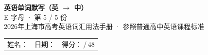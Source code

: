 \documentclass[10pt,a4paper]{article}
\begin{document}
\pagestyle{plain}

\begin{center}
{\LARGE\bfseries 英语单词默写（英 $\to$ 中）}\\[0.22em]
{\large E 字母 · 第 5 / 5 份}\\[0.18em]
{\small 2026年上海市高考英语词汇用法手册 · 参照普通高中英语课程标准}
\end{center}

\vspace{0.25em}
\noindent\begin{tabular}{@{}p{}@{}p{}@{}p{}@{}}
姓名：\underline{\hspace{2.0cm}} & 日期：\underline{\hspace{2.0cm}} & 得分：\underline{\hspace{1.3cm}}\,/\,48 \\
\end{tabular}

\vspace{0.3em}

\vspace{0.08em}
\end{document}
